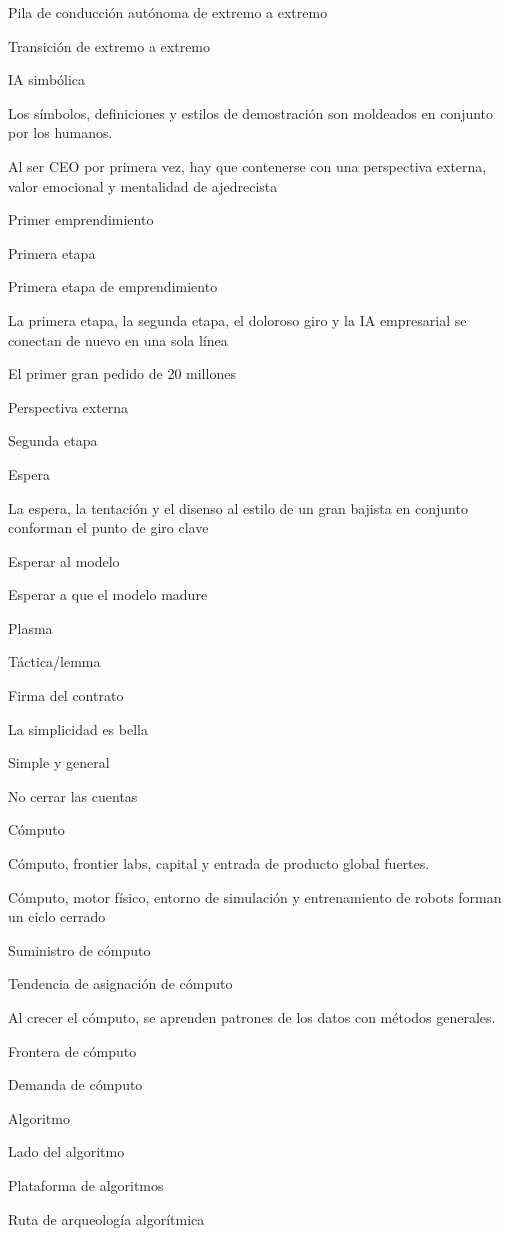 \documentclass{article}
\begin{document}
Pila de conducción autónoma de extremo a extremo

Transición de extremo a extremo

IA simbólica

Los símbolos, definiciones y estilos de demostración son moldeados en conjunto por los humanos.

Al ser CEO por primera vez, hay que contenerse con una perspectiva externa, valor emocional y mentalidad de ajedrecista

Primer emprendimiento

Primera etapa

Primera etapa de emprendimiento

La primera etapa, la segunda etapa, el doloroso giro y la IA empresarial se conectan de nuevo en una sola línea

El primer gran pedido de 20 millones

Perspectiva externa

Segunda etapa

Espera

La espera, la tentación y el disenso al estilo de un gran bajista en conjunto conforman el punto de giro clave

Esperar al modelo

Esperar a que el modelo madure

Plasma

Táctica/lemma

Firma del contrato

La simplicidad es bella

Simple y general

No cerrar las cuentas

Cómputo

Cómputo, frontier labs, capital y entrada de producto global fuertes.

Cómputo, motor físico, entorno de simulación y entrenamiento de robots forman un ciclo cerrado

Suministro de cómputo

Tendencia de asignación de cómputo

Al crecer el cómputo, se aprenden patrones de los datos con métodos generales.

Frontera de cómputo

Demanda de cómputo

Algoritmo

Lado del algoritmo

Plataforma de algoritmos

Ruta de arqueología algorítmica
\end{document}
